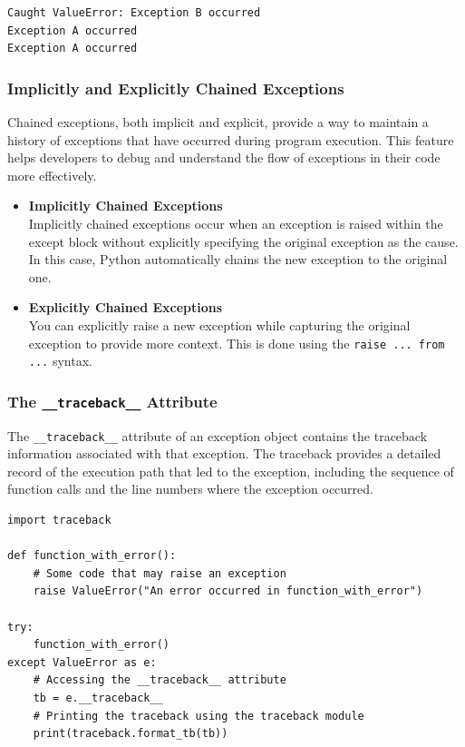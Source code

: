 \begin{verbatim}
Caught ValueError: Exception B occurred
Exception A occurred
Exception A occurred
\end{verbatim}

\subsubsection{Implicitly and Explicitly Chained Exceptions}
Chained exceptions, both implicit and explicit, provide a way to maintain a history of exceptions that have occurred during program execution. This feature helps developers to debug and understand the flow of exceptions in their code more effectively.

\begin{itemize}
\item \textbf{Implicitly Chained Exceptions}\\ Implicitly chained exceptions occur when an exception is raised within the except block without explicitly specifying the original exception as the cause. In this case, Python automatically chains the new exception to the original one.
\item \textbf{Explicitly Chained Exceptions}\\
You can explicitly raise a new exception while capturing the original exception to provide more context. This is done using the \texttt{raise ... from ...} syntax. 
\end{itemize}

\newpage
\subsubsection{The \texttt{\_\_traceback\_\_} Attribute}
The \texttt{\_\_traceback\_\_} attribute of an exception object contains the traceback information associated with that exception. The traceback provides a detailed record of the execution path that led to the exception, including the sequence of function calls and the line numbers where the exception occurred.

\begin{codebox}
\begin{verbatim}
import traceback

def function_with_error():
    # Some code that may raise an exception
    raise ValueError("An error occurred in function_with_error")

try:
    function_with_error()
except ValueError as e:
    # Accessing the __traceback__ attribute
    tb = e.__traceback__
    # Printing the traceback using the traceback module
    print(traceback.format_tb(tb))
\end{verbatim}
\end{codebox}

